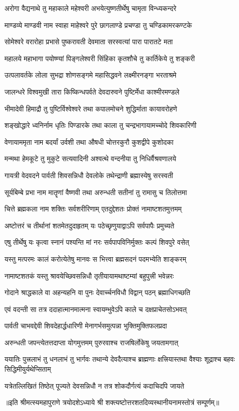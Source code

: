 \twolineshloka
{अरोगा वैद्यनाथे तु महाकाले महेश्वरी}
{अभयेत्युष्णतीर्थेषु चामृता विन्ध्यकन्दरे}

\twolineshloka
{माण्डव्ये माण्डवी नाम स्वाहा माहेश्वरे पुरे}
{छागलाण्डे प्रचण्डा तु चण्डिकामरकण्टके}

\twolineshloka
{सोमेश्वरे वरारोहा प्रभासे पुष्करावती}
{देवमाता सरस्वत्यां पारा पारातटे मता}

\twolineshloka
{महालये महाभागा पयोष्ण्यां पिङ्गलेश्वरी}
{सिंहिका कृतशौचे तु कार्तिकेये तु शङ्करी}

\twolineshloka
{उत्पलावर्तके लोला सुभद्रा शोणसङ्गमे}
{महासिद्धवने लक्ष्मीरनङ्गा भरताश्रमे}

\twolineshloka
{जालन्धरे विश्वमुखी तारा किष्किन्धपर्वते}
{देवदारुवने पुष्टिर्मेधा काश्मीरमण्डले}

\twolineshloka
{भीमादेवी हिमाद्रौ तु पुष्टिर्विश्वेश्वरे तथा}
{कपालमोचने शुद्धिर्माता कायावरोहणे}

\twolineshloka
{शङ्खोद्धारे ध्वनिर्नाम धृतिः पिण्डारके तथा}
{काला तु चन्द्रभागायामच्चोदे शिवकारिणी}

\twolineshloka
{वेणायाममृता नाम बदर्यां उर्वशी तथा}
{औषधी चोत्तरकुरौ कुशद्वीपे कुशोदका}

\twolineshloka
{मन्मथा हेमकूटे तु मुकुटे सत्यवादिनी}
{अश्वत्थे वन्दनीया तु निधिर्वैश्रवणालये}

\twolineshloka
{गायत्री वेदवदने पार्वती शिवसन्निधौ}
{देवलोके तथेन्द्राणी ब्रह्मास्येषु सरस्वती}

\twolineshloka
{सूर्यबिम्बे प्रभा नाम मातॄणां वैष्णवी तथा}
{अरुन्धती सतीनां तु रामासु च तिलोत्तमा}

\twolineshloka
{चित्ते ब्रह्मकला नाम शक्तिः सर्वशरीरिणाम्}
{एतदुद्देशतः प्रोक्तं नामाष्टशतमुत्तमम्}

\twolineshloka
{अष्टोत्तरं च तीर्थानां शतमेतदुदाहृतम्}
{यः पठेच्छृणुयाद्वाऽपि सर्वपापैः प्रमुच्यते}

\twolineshloka
{एषु तीर्थेषु यः कृत्वा स्नानं पश्यन्ति मां नरः}
{सर्वपापविनिर्मुक्तः कल्पं शिवपुरे वसेत्}

\twolineshloka
{यस्तु मत्परमः कालं करोत्येतेषु मानवः}
{स भित्त्वा ब्रह्मसदनं पदमभ्येति शाङ्करम्}

\twolineshloka
{नामाष्टशतकं यस्तु श्रावयेच्छिवसन्निधौ}
{तृतीयायामथाष्टम्यां बहुपुत्त्री भवेन्नरः}

\twolineshloka
{गोदाने श्राद्धकाले वा अहन्यहनि वा पुनः}
{देवार्च्चनविधौ विद्वान् पठन् ब्रह्माधिगच्छति}

\twolineshloka
{एवं वदन्ती सा तत्र ददाहात्मानमात्मना}
{स्वायम्भुवेऽपि काले च दक्षप्राचेतसोऽभवत्}

\twolineshloka
{पार्वती चाभवद्देवी शिवदेहार्द्धधारिणी}
{मेनागर्भसमुत्पन्ना भुक्तिमुक्तिफलप्रदा}

\twolineshloka
{अरुन्धती जपन्त्येतत्तदाप्ता योगमुत्तमम्}
{पुरुरवाश्च राजषिर्लोकेषु जयतामगात्}

\threelineshloka
{ययातिः पुत्त्रलाभं तु धनलाभं तु भार्गवः}
{तथान्ये देवदैत्याश्च ब्राह्मणाः क्षत्त्रियास्तथा}
{वैश्याः शूद्राश्च बहवः सिद्धिमीयुर्यथेप्सिताम्}

\twolineshloka
{यत्रेतल्लिखितं तिष्ठेत् पूज्यते देवसन्निधौ}
{न तत्र शोकदौर्गत्यं कदाचिदपि जायते}

॥इति श्रीमत्स्यमहापुराणे त्रयोदशेऽध्याये श्री शक्त्यष्टोत्तरशतदिव्यस्थानीयनामस्तोत्रं सम्पूर्णम्॥